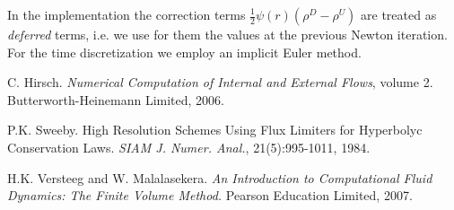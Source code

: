 \documentclass[12pt, a4paper]{article}
\begin{document}
In the implementation the correction terms $\frac{1}{2} \psi(r) (\rho^D - 
\rho^U)$ are treated as \emph{deferred} terms, i.e. we use for them the values 
at the previous Newton iteration.\\
For the time discretization we employ an implicit Euler method.
\begin{thebibliography}{99}\label{sec:bib}
	 C. Hirsch. \emph{Numerical Computation of Internal and 
	External Flows}, volume 2. Butterworth-Heinemann Limited, 2006.
	
	 P.K. Sweeby. High Resolution Schemes Using Flux Limiters 
	for Hyperbolyc Conservation Laws. \emph{SIAM J. Numer. Anal.}, 
	21(5):995-1011, 1984.
	
	 H.K. Versteeg and W. Malalasekera. \emph{An Introduction 
	to Computational Fluid Dynamics: The Finite Volume Method.} Pearson 
	Education Limited, 2007.
	
\end{thebibliography}
\end{document}
